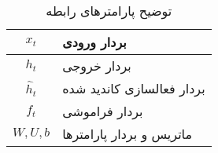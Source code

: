 \begin{table}[h]
  \centering
  \caption{توضیح پارامترهای رابطه }
  \begin{tabular}{|c|p{}|}
    \hline
    $x_{t}$ & بردار ورودی \\
    \hline
    $h_{t}$ & بردار خروجی \\
    \hline
    ${\hat {h}}_{t}$ & بردار فعالسازی کاندید شده \\
    \hline
    $f_{t}$ & بردار فراموشی \\
    \hline
    $W, U ,b$ & ماتریس و بردار پارامترها \\
    \hline
  \end{tabular}
  \label{tbl:distance}
\end{table}
